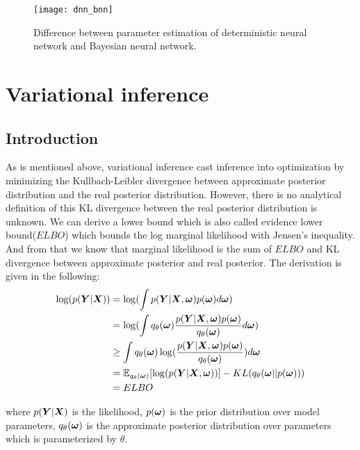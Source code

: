 \begin{figure}[H]
	\begin{center}
		\texttt{[image: dnn\_bnn]}
		\caption{Difference between parameter estimation of deterministic neural network and Bayesian neural network.}		
		\label{fig:dnn_bnn}
	\end{center}
\end{figure}

\section{Variational inference}
\subsection{Introduction}
As is mentioned above, variational inference cast inference into optimization by minimizing the Kullbach-Leibler divergence between approximate posterior distribution and the real posterior distribution. However, there is no analytical definition of this KL divergence between the real posterior distribution is unknown. We can derive a lower bound which is also called evidence lower bound($ELBO$) which bounds the log marginal likelihood with Jensen's inequality. And from that we know that marginal likelihood is the sum of $ELBO$ and KL divergence between approximate posterior and real posterior. The derivation is given in the following:
\begin{equation}\label{2.6}	
\begin{aligned}
	\log(p(\boldsymbol{Y}|\boldsymbol{X})) & = \log(\int p(\boldsymbol{Y}| \boldsymbol{X}, \boldsymbol{\omega})  p(\boldsymbol{\omega})d\boldsymbol{\omega}) \\	 
	& = \log(\int{q_{\theta}(\boldsymbol{\omega}) \frac{p(\boldsymbol{Y}| \boldsymbol{X}, \boldsymbol{\omega}) p(\boldsymbol{\omega})}{q_{\theta}(\boldsymbol{\omega})}d\boldsymbol{\omega}}) \\
	& \geq \int q_{\theta}(\boldsymbol{\omega}) \log( \frac{p(\boldsymbol{Y}| \boldsymbol{X}, \boldsymbol{\omega}) p(\boldsymbol{\omega})}{q_{\theta}(\boldsymbol{\omega})}) d\boldsymbol{\omega} \\
	& = \mathbb E_{q_{\theta}(\boldsymbol{\omega})}[\log(p(\boldsymbol{Y}| \boldsymbol{X}, \boldsymbol{\omega}))] -  KL(q_{\theta}(\boldsymbol{\omega}||p(\boldsymbol{\omega})))\\
	& = ELBO
\end{aligned}
\end{equation}

where $p(\boldsymbol Y| \boldsymbol X)$ is the likelihood, $p(\boldsymbol \omega)$ is the prior distribution over model parameters, $q_{\theta}(\boldsymbol \omega)$ is the approximate posterior distribution over parameters which is parameterized by $\theta$.

